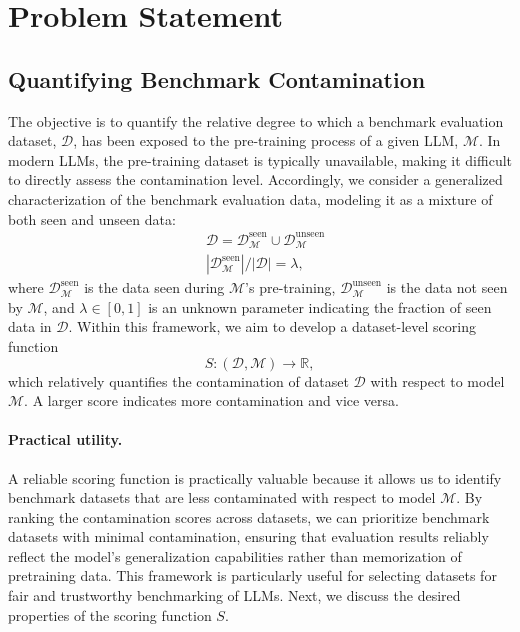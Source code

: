 \section{Problem Statement}
\label{sec:problem_statement}

\subsection{Quantifying Benchmark Contamination}

The objective is to quantify the relative degree to which a benchmark evaluation dataset, $\mathcal{D}$, has been exposed to the pre-training process of a given LLM, $\mathcal{M}$. 
In modern LLMs, the pre-training dataset is typically unavailable, making it difficult to directly assess the contamination level.
Accordingly, we consider a generalized characterization of the benchmark evaluation data, modeling it as a mixture of both seen and unseen data:
\begin{equation}
\begin{split}
   &  \mathcal{D} = \mathcal{D}_{\mathcal{M}}^\text{seen} \cup \mathcal{D}_{\mathcal{M}}^\text{unseen} \\
    & |\mathcal{D}_{\mathcal{M}}^\text{seen}| / |\mathcal{D}| = \lambda,
    \end{split}
\end{equation}
where $\mathcal{D}_{\mathcal{M}}^\text{seen}$ is the data seen during $\mathcal{M}$'s pre-training, $\mathcal{D}_{\mathcal{M}}^\text{unseen}$ is the data not seen by $\mathcal{M}$, and $\lambda \in [0,1]$ is an unknown parameter indicating the fraction of seen data in $\mathcal{D}$.
Within this framework, we aim to develop a dataset-level scoring function 
$$S: (\mathcal{D}, \mathcal{M}) \rightarrow \mathbb{R},$$ 
which relatively quantifies the contamination of dataset $\mathcal{D}$ with respect to model $\mathcal{M}$. A larger score indicates more contamination and vice versa. 

\paragraph{Practical utility.} A reliable scoring function is practically valuable because it allows us to identify benchmark datasets that are less contaminated with respect to model $\mathcal{M}$. By ranking the contamination scores across datasets, we can prioritize benchmark datasets with minimal contamination, ensuring that evaluation results reliably reflect the model's generalization capabilities rather than memorization of pretraining data. This framework is particularly useful for selecting datasets for fair and trustworthy benchmarking of LLMs. Next, we discuss the desired properties of the scoring function $S$.


